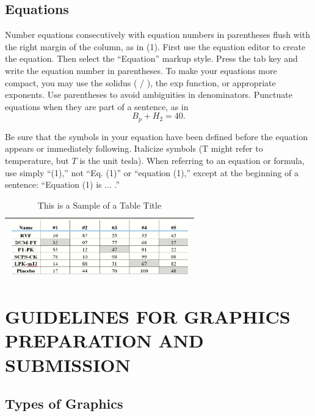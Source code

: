 \documentclass{IEEEtaes}
\begin{document}
\subsection{Equations}

Number equations consecutively with equation numbers in parentheses flush with the right margin of the column, as in (1). First use the equation editor to create the equation. Then select the ``Equation'' markup style. Press the tab key and write the equation number in parentheses. To make your equations more compact, you may use the solidus ( / ), the exp function, or appropriate exponents. Use parentheses to avoid ambiguities in denominators. Punctuate equations when they are part of a sentence, as in
\begin{equation}
B_p+H_2=40.
\end{equation}

Be sure that the symbols in your equation have been defined before the equation appears or immediately following. Italicize symbols (T might refer to temperature, but $T$ is the unit tesla). When referring to an equation or formula, use simply ``(1),'' not ``Eq. (1)'' or ``equation (1),'' except at the beginning of a sentence: ``Equation (1) is ... .''

\begin{table}
\caption{This is a Sample of a Table Title}
\label{table}
\tablefont
\begin{tabular*}{20pc}{@{}c@{}}
\hline
\centerline{\includegraphics[width=18.5pc]{figtbl1.png}}\\
\hline
\end{tabular*}
\label{tab1}
\end{table}


\section{GUIDELINES FOR GRAPHICS PREPARATION AND SUBMISSION}

\subsection{Types of Graphics}
\end{document}

